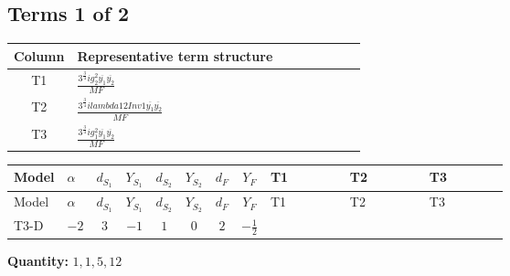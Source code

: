 \documentclass[8pt]{article}
\begin{document}
\begin{landscape}
\subsection*{Terms 1 of 2}
\begin{center}
\begin{tabular}{@{}c >{\raggedright\arraybackslash}p{0.82\linewidth}@{}}
\toprule
Column & Representative term structure \\
\midrule
T1 & \(\displaystyle \frac{3^{\frac{3}{4}} i g_{2}^{2} \overline{y_{1}} \overline{y_{2}}}{MF}\) \\
\midrule
T2 & \(\displaystyle \frac{3^{\frac{3}{4}} i lambda12Inv1 \overline{y_{1}} \overline{y_{2}}}{MF}\) \\
\midrule
T3 & \(\displaystyle \frac{3^{\frac{3}{4}} i g_{1}^{2} \overline{y_{1}} \overline{y_{2}}}{MF}\) \\
\midrule
\bottomrule
\end{tabular}
\end{center}
\smallskip
\tiny
\begin{longtable}{@{}llcccccc >{\raggedright\arraybackslash}p{0.21\linewidth} >{\raggedright\arraybackslash}p{0.21\linewidth} >{\raggedright\arraybackslash}p{0.21\linewidth}@{}}
\toprule
Model & $\alpha$ & $d_{S_1}$ & $Y_{S_1}$ & $d_{S_2}$ & $Y_{S_2}$ & $d_F$ & $Y_F$ & T1 & T2 & T3 \\
\midrule
\endfirsthead
\toprule
Model & $\alpha$ & $d_{S_1}$ & $Y_{S_1}$ & $d_{S_2}$ & $Y_{S_2}$ & $d_F$ & $Y_F$ & T1 & T2 & T3 \\
\midrule
\endhead
T3-D & $-2$ & $3$ & $-1$ & $1$ & $0$ & $2$ & $-\frac{1}{2}$ & \scriptsize\adjustbox{max width=\linewidth}{$\begin{gathered} - \frac{17 \cdot 3^{\frac{3}{4}} i g_{2}^{2} \overline{y_{1}} \overline{y_{2}}}{24 MF}\end{gathered}$} & \scriptsize\adjustbox{max width=\linewidth}{$\begin{gathered} - \frac{3^{\frac{3}{4}} i lambda12Inv1 \overline{y_{1}} \overline{y_{2}}}{6 MF}\end{gathered}$} & \scriptsize\adjustbox{max width=\linewidth}{$\begin{gathered} - \frac{3^{\frac{3}{4}} i g_{1}^{2} \overline{y_{1}} \overline{y_{2}}}{8 MF}\end{gathered}$} \\
\midrule
\bottomrule
\end{longtable}
\clearpage
\noindent\textbf{Quantity: }$\mathrm{1,1,5,12}$\par\smallskip

\end{landscape}
\end{document}
